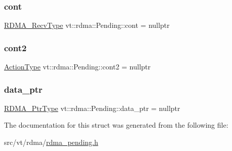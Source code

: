 \subsubsection{\texorpdfstring{cont}{cont}}
{\footnotesize\ttfamily \hyperlink{namespacevt_1_1rdma_aa07fa86d8eca8853254b40fc0e565726}{R\+D\+M\+A\+\_\+\+Recv\+Type} vt\+::rdma\+::\+Pending\+::cont = nullptr}

\mbox{\label{structvt_1_1rdma_1_1_pending_a55d01ceada3293160e3167eb7194b9bd}} 
\subsubsection{\texorpdfstring{cont2}{cont2}}
{\footnotesize\ttfamily \hyperlink{namespacevt_ae0a5a7b18cc99d7b732cb4d44f46b0f3}{Action\+Type} vt\+::rdma\+::\+Pending\+::cont2 = nullptr}

\mbox{\label{structvt_1_1rdma_1_1_pending_afcbb4951a3cfaa8981063487c0b90548}} 
\subsubsection{\texorpdfstring{data\+\_\+ptr}{data\_ptr}}
{\footnotesize\ttfamily \hyperlink{namespacevt_a9e2c953286c7616f7c218e9951790776}{R\+D\+M\+A\+\_\+\+Ptr\+Type} vt\+::rdma\+::\+Pending\+::data\+\_\+ptr = nullptr}



The documentation for this struct was generated from the following file\+:\begin{DoxyCompactItemize}
\item 
src/vt/rdma/\hyperlink{rdma__pending_8h}{rdma\+\_\+pending.\+h}\end{DoxyCompactItemize}
